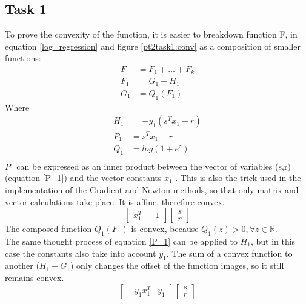 \subsection{Task 1}
To prove the convexity of the function, it is easier to breakdown function F, in equation \ref{log_regression} and figure \ref{pt2task1:conv} as a composition of smaller functions: \begin{equation}
   \begin{split}
    F &= F_1 + \hdots + F_k  \\ 
F_1 &= G_1 + H_1 \\
G_1 &= Q_1(F_1)
\end{split}
\end{equation}
Where \begin{equation}
   \begin{split}
   H_1&= -y_1(s^{T}x_1-r)\\
   P_1&= s^{T}x_1 - r  \\
   Q_1 &= log(1+ e^z)\\
   \end{split}
\end{equation}
$P_1$ can be expressed as an inner product between the vector of variables (s,r) (equation \ref{P_1}) and the vector constants $x_1$ . This is also the trick used in the implementation of the Gradient and Newton methods, so that only matrix and vector calculations take place. It is affine, therefore convex.
\begin{equation}
\label{P_1}
\begin{bmatrix} x_1^{T} & -1\end{bmatrix} \begin{bmatrix} s \\
                                                           r
                                                           \end{bmatrix}
\end{equation}
The composed function $Q_1(F_1)$ is convex, because $\ddot Q_1(z) > 0, \forall z \in \mathbb{R}$.\\ 
The same thought process of equation \ref{P_1} can be applied to $H_1$, but in this case the constants also take into account $y_1$. The sum of a convex function to another  ($H_1 + G_1$) only changes the offset of the function images, so it still remains convex.
\begin{equation}
\label{H_1}
\begin{bmatrix} -y_1x_1^{T} & y_1\end{bmatrix} \begin{bmatrix} s \\
                                                           r
                                                           \end{bmatrix}
\end{equation}
